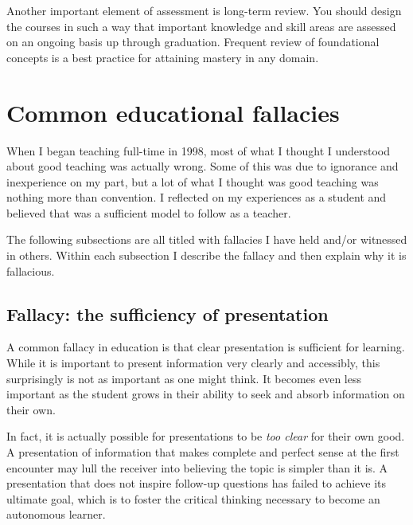 \vskip 10pt

Another important element of assessment is long-term review.  You should design the courses in such a way that important knowledge and skill areas are assessed on an ongoing basis up through graduation.  Frequent review of foundational concepts is a best practice for attaining mastery in any domain.











\filbreak
\section{Common educational fallacies}

When I began teaching full-time in 1998, most of what I thought I understood about good teaching was actually wrong.  Some of this was due to ignorance and inexperience on my part, but a lot of what I thought was good teaching was nothing more than convention.  I reflected on my experiences as a student and believed that was a sufficient model to follow as a teacher.

\vskip 10pt

The following subsections are all titled with fallacies I have held and/or witnessed in others.  Within each subsection I describe the fallacy and then explain why it is fallacious.



\subsection{Fallacy: the sufficiency of presentation}

A common fallacy in education is that clear presentation is sufficient for learning.  While it is important to present information very clearly and accessibly, this surprisingly is not as important as one might think.  It becomes even less important as the student grows in their ability to seek and absorb information on their own.

In fact, it is actually possible for presentations to be \textit{too clear} for their own good.  A presentation of information that makes complete and perfect sense at the first encounter may lull the receiver into believing the topic is simpler than it is.  A presentation that does not inspire follow-up questions has failed to achieve its ultimate goal, which is to foster the critical thinking necessary to become an autonomous learner.





